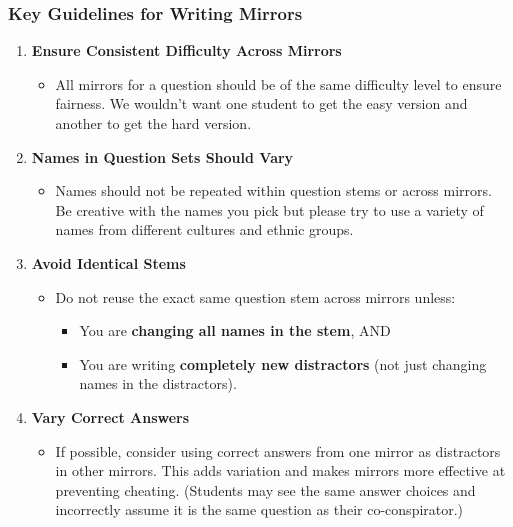 \documentclass[
]{article}
\providecommand{\tightlist}{%
  \setlength{\itemsep}{0pt}\setlength{\parskip}{0pt}}
\begin{document}
\hypertarget{key-guidelines-for-writing-mirrors}{%
\subsubsection{Key Guidelines for Writing Mirrors}\label{key-guidelines-for-writing-mirrors}}

\begin{enumerate}
\def\labelenumi{\arabic{enumi}.}
\tightlist
\item
  \textbf{Ensure Consistent Difficulty Across Mirrors}

  \begin{itemize}
  \tightlist
  \item
    All mirrors for a question should be of the same difficulty level to ensure fairness. We wouldn't want one student to get the easy version and another to get the hard version.
  \end{itemize}
\item
  \textbf{Names in Question Sets Should Vary}

  \begin{itemize}
  \tightlist
  \item
    Names should not be repeated within question stems or across mirrors. Be creative with the names you pick but please try to use a variety of names from different cultures and ethnic groups.
  \end{itemize}
\item
  \textbf{Avoid Identical Stems}

  \begin{itemize}
  \tightlist
  \item
    Do not reuse the exact same question stem across mirrors unless:

    \begin{itemize}
    \tightlist
    \item
      You are \textbf{changing all names in the stem}, AND
    \item
      You are writing \textbf{completely new distractors} (not just changing names in the distractors).
    \end{itemize}
  \end{itemize}
\item
  \textbf{Vary Correct Answers}

  \begin{itemize}
  \tightlist
  \item
    If possible, consider using correct answers from one mirror as distractors in other mirrors. This adds variation and makes mirrors more effective at preventing cheating. (Students may see the same answer choices and incorrectly assume it is the same question as their co-conspirator.)
  \end{itemize}
\end{enumerate}
\end{document}
